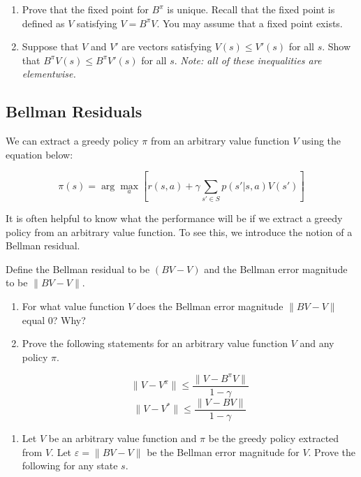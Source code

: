 \documentclass[12pt]{article}
\begin{document}
{{\begin{enumerate}[]
    \item Prove that the fixed point for $B^{\pi}$ is unique. Recall that the fixed point is defined as $V$ satisfying $V = B^{\pi}V$. You may assume that a fixed point exists. 
    
    \item Suppose that $V$ and $V'$ are vectors satisfying $V(s) \leq V'(s)$ for all $s$. Show that $B^{\pi}V(s) \leq B^{\pi}V'(s)$ for all $s$. 
    \textit{Note: all of these inequalities are elementwise.} 
    
\end{enumerate}

\subsection{Bellman Residuals} 
We can extract a greedy policy $\pi$ from an arbitrary value function $V$ using the equation below:

\[
\pi(s) = \arg\max_a \left[ r(s, a) + \gamma \sum_{s' \in S} p(s'|s, a)V(s') \right]
\]

It is often helpful to know what the performance will be if we extract a greedy policy from an arbitrary value function. To see this, we introduce the notion of a Bellman residual.

Define the Bellman residual to be $(BV - V)$ and the Bellman error magnitude to be $\|BV - V\|$.

\begin{enumerate}[resume*]
    \item For what value function $V$ does the Bellman error magnitude $\|BV - V\|$ equal 0? Why?    
    \item Prove the following statements for an arbitrary value function $V$ and any policy $\pi$. 
    
    \[
    \|V - V^{\pi}\| \leq \frac{\|V - B^{\pi}V\|}{1 - \gamma}\] \[
    \|V - V^{\ast}\| \leq \frac{\|V - BV\|}{1 - \gamma}
    \]
    \end{enumerate}

\begin{enumerate}[resume*]
    \item Let $V$ be an arbitrary value function and $\pi$ be the greedy policy extracted from $V$. Let $\varepsilon = \|BV - V\|$ be the Bellman error magnitude for $V$. Prove the following for any state $s$. 
    

\end{enumerate}}}
\end{document}
